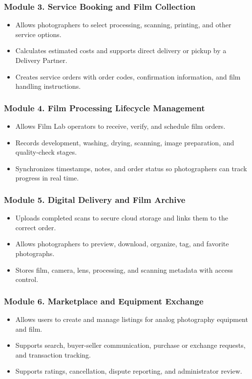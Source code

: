 \subsubsection*{Module 3. Service Booking and Film Collection}
\begin{itemize}
    \item Allows photographers to select processing, scanning, printing, and
    other service options.
    \item Calculates estimated costs and supports direct delivery or pickup by a
    Delivery Partner.
    \item Creates service orders with order codes, confirmation information, and
    film handling instructions.
\end{itemize}

\subsubsection*{Module 4. Film Processing Lifecycle Management}
\begin{itemize}
    \item Allows Film Lab operators to receive, verify, and schedule film orders.
    \item Records development, washing, drying, scanning, image preparation, and
    quality-check stages.
    \item Synchronizes timestamps, notes, and order status so photographers can
    track progress in real time.
\end{itemize}

\subsubsection*{Module 5. Digital Delivery and Film Archive}
\begin{itemize}
    \item Uploads completed scans to secure cloud storage and links them to the
    correct order.
    \item Allows photographers to preview, download, organize, tag, and favorite
    photographs.
    \item Stores film, camera, lens, processing, and scanning metadata with access
    control.
\end{itemize}

\subsubsection*{Module 6. Marketplace and Equipment Exchange}
\begin{itemize}
    \item Allows users to create and manage listings for analog photography
    equipment and film.
    \item Supports search, buyer-seller communication, purchase or exchange
    requests, and transaction tracking.
    \item Supports ratings, cancellation, dispute reporting, and administrator
    review.
\end{itemize}

